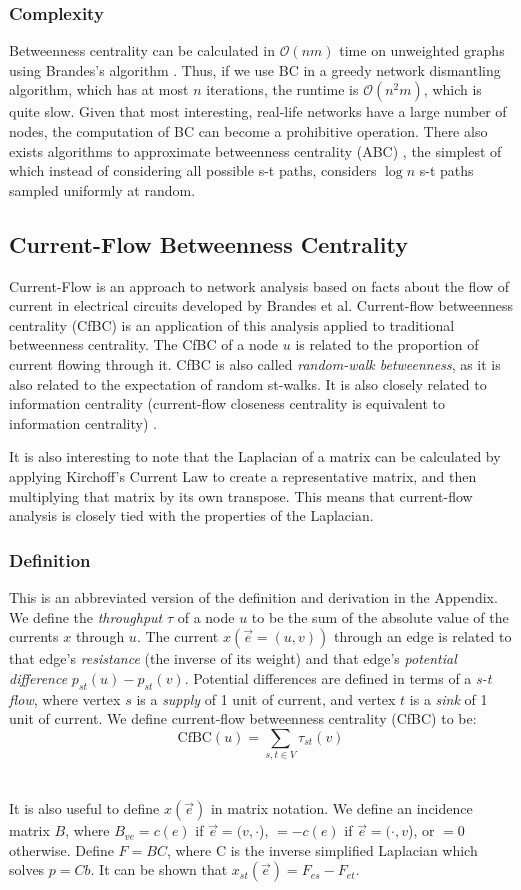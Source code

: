 \documentclass{article}
\begin{document}
\subsubsection{Complexity}
Betweenness centrality can be calculated in $\mathcal{O}(nm)$ time on unweighted graphs using Brandes's algorithm \cite{betweennessfast}. 
Thus, if we use BC in a greedy network dismantling algorithm, which has at most $n$ iterations, the runtime is $\mathcal{O}(n^2m)$, which is quite slow. Given that most interesting, real-life networks have a large number of nodes, the computation of BC can become a prohibitive operation.
There also exists algorithms to approximate betweenness centrality (ABC) \cite{abc}, the simplest of which instead of considering all possible s-t paths, considers $\log{n}$ s-t paths sampled uniformly at random.

\subsection{Current-Flow Betweenness Centrality}
Current-Flow is an approach to network analysis based on facts about the flow of current in electrical circuits developed by Brandes et al. Current-flow betweenness centrality (CfBC) is an application of this analysis applied to traditional betweenness centrality. The CfBC of a node $u$ is related to the proportion of current flowing through it. CfBC is also called \textit{random-walk betweenness}, as it is also related to the expectation of random st-walks. It is also closely related to information centrality (current-flow closeness centrality is equivalent to information centrality) \cite{current}.

It is also interesting to note that the Laplacian of a matrix can be calculated by applying Kirchoff’s Current Law to create a representative matrix, and then multiplying that matrix by its own transpose. This means that current-flow analysis is closely tied with the properties of the Laplacian.

\subsubsection{Definition}
This is an abbreviated version of the definition and derivation in the Appendix. We  define the \textit{throughput} $\tau$ of a node $u$ to be the sum of the absolute value of the currents $x$ through $u$. The current $x(\Vec{e}=(u,v))$ through an edge is related to that edge's \textit{resistance} (the inverse of its weight) and that edge's \textit{potential difference} $p_{st}(u) - p_{st}(v)$. Potential differences are defined in terms of a \textit{s-t flow}, where vertex $s$ is a \textit{supply} of 1 unit of current, and vertex $t$ is a \textit{sink} of 1 unit of current. We define current-flow betweenness centrality (CfBC) to be: $$ \text{CfBC}(u) = \sum_{s,t \in V} \tau_{st}(v)$$
\\\\
It is also useful to define $x(\Vec{e})$ in matrix notation. We define an incidence matrix $B$, where $B_{ve} = c(e)$ if $\Vec{e} = (v, \cdot$), $= -c(e)$ if $\Vec{e} = (\cdot, v$), or $= 0$ otherwise. Define $F = BC$, where C is the inverse simplified Laplacian which solves $p = C b$. It can be shown that $x_{st}(\Vec{e}) = F_{es} - F_{et}$.
\end{document}
